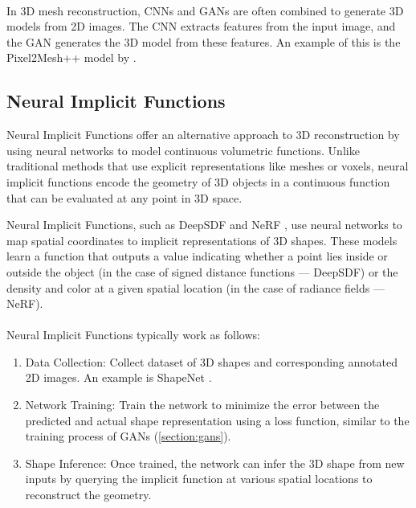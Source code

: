 \paragraph{}
In 3D mesh reconstruction, CNNs and GANs are often combined to generate 3D models from 2D images. The CNN extracts features from the input image, and the GAN generates the 3D model from these features. An example of this is the Pixel2Mesh++ model by \textcite{wen_pixel2mesh_2019}.

\subsection{Neural Implicit Functions} \label{section:nif}
Neural Implicit Functions offer an alternative approach to 3D reconstruction by using neural networks to model continuous volumetric functions. Unlike traditional methods that use explicit representations like meshes or voxels, neural implicit functions encode the geometry of 3D objects in a continuous function that can be evaluated at any point in 3D space.

Neural Implicit Functions, such as DeepSDF \autocite{park_deepsdf_2019} and NeRF \autocite{mildenhall_nerf_2021}, use neural networks to map spatial coordinates to implicit representations of 3D shapes. These models learn a function that outputs a value indicating whether a point lies inside or outside the object (in the case of signed distance functions — DeepSDF) or the density and color at a given spatial location (in the case of radiance fields — NeRF).

\paragraph{}
Neural Implicit Functions typically work as follows:
\begin{enumerate}
    \item Data Collection: Collect dataset of 3D shapes and corresponding annotated 2D images. An example is ShapeNet \autocite{chang_shapenet_2015}.
    \item Network Training: Train the network to minimize the error between the predicted and actual shape representation using a loss function, similar to the training process of GANs (\ref{section:gans}).
    \item Shape Inference: Once trained, the network can infer the 3D shape from new inputs by querying the implicit function at various spatial locations to reconstruct the geometry.
\end{enumerate}


